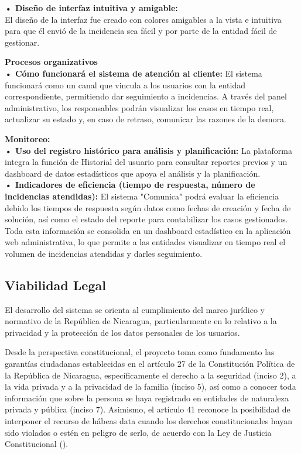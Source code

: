 \textbf{• Diseño de interfaz intuitiva y amigable:} \\
El diseño de la interfaz fue creado con colores amigables a la vista e intuitiva para que él envió de la incidencia sea fácil y por parte de la entidad fácil de gestionar.

\vspace{0.5cm}
\textbf{Procesos organizativos}\\

\textbf{• Cómo funcionará el sistema de atención al cliente:} El sistema funcionará como un canal que vincula a los usuarios con la entidad correspondiente, permitiendo dar seguimiento a incidencias. A través del panel administrativo, los responsables  podrán visualizar los casos en tiempo real, actualizar su estado y, en caso de retraso, comunicar las razones de la demora.

\vspace{0.5cm}
\textbf{Monitoreo:}\\
\textbf{• Uso del registro histórico para análisis y planificación:} La plataforma integra la función de Historial del usuario para consultar reportes previos y un dashboard de datos estadísticos que apoya el análisis y la planificación.\\

\textbf{• Indicadores de eficiencia (tiempo de respuesta, número de incidencias atendidas):} El sistema "Comunica" podrá evaluar la eficiencia debido los tiempos de respuesta según datos como fechas de creación y fecha de solución, así como el estado del reporte para contabilizar los casos gestionados. Toda esta información se consolida en un dashboard estadístico en la aplicación web administrativa, lo que permite a las entidades visualizar en tiempo real el volumen de incidencias atendidas y darles seguimiento.

\subsection{Viabilidad Legal}
\label{subsec:legal}

El desarrollo del sistema se orienta al cumplimiento del marco jurídico y normativo de la República de Nicaragua, particularmente en lo relativo a la privacidad y la protección de los datos personales de los usuarios.

Desde la perspectiva constitucional, el proyecto toma como fundamento las garantías ciudadanas establecidas en el artículo 27 de la Constitución Política de la República de Nicaragua, específicamente el derecho a la seguridad (inciso 2), a la vida privada y a la privacidad de la familia (inciso 5), así como a conocer toda información que sobre la persona se haya registrado en entidades de naturaleza privada y pública (inciso 7). Asimismo, el artículo 41 reconoce la posibilidad de interponer el recurso de hábeas data cuando los derechos constitucionales hayan sido violados o estén en peligro de serlo, de acuerdo con la Ley de Justicia Constitucional (\cite{asamblea2026norma}).

